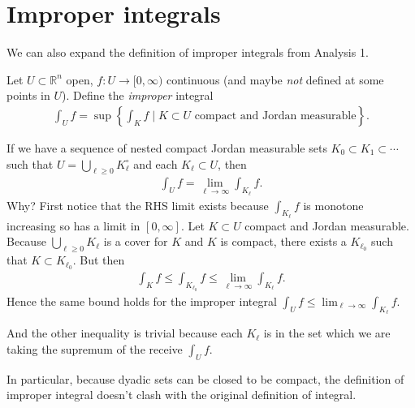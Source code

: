 \section{Improper integrals}

We can also expand the definition of improper integrals from Analysis 1.

\begin{definition}\label{def:improp-int}
	Let $U \subset \mathbb{R}^{n}$ open, $f: U \to [0,\infty)$ continuous (and maybe \textit{not} defined at some points in $U$). Define the \textit{improper} integral
	\begin{align*}
		\int_{U} f = \sup \left\{ \int_{K} f \mid K \subset U \text{ compact and Jordan measurable} \right\}.
	\end{align*}
\end{definition}

\begin{remark}
	If we have a sequence of nested compact Jordan measurable sets $K_{0} \subset K_{1} \subset \cdots$ such that $U = \bigcup_{\ell \geq 0} K_{\ell}^{\circ }$ and each $K_{\ell} \subset U$, then
	\begin{align*}
		\int_{U} f = \lim_{\ell \to \infty} \int_{K_{\ell}} f.
	\end{align*}
	Why? First notice that the RHS limit exists because $ \int_{K_{\ell}} f$ is monotone increasing so has a limit in $[0,\infty]$. Let $K \subset U$ compact and Jordan measurable. Because $\bigcup_{\ell \geq 0} K_{\ell}$ is a cover for $K$ and $K$ is compact, there exists a $K_{\ell_{0}}$ such that $K \subset K_{\ell_{0}}$. But then
	\begin{align*}
		\int_{K} f \leq \int_{K_{\ell_{0}}} f \leq \lim_{\ell \to \infty} \int_{K_{\ell}} f.
	\end{align*}
	Hence the same bound holds for the improper integral $\int_{U} f \leq \lim_{\ell \to \infty} \int_{K_{\ell}} f$.

	And the other inequality is trivial because each $K_{\ell}$ is in the set which we are taking the supremum of the receive $ \int_{U} f$.

	In particular, because dyadic sets can be closed to be compact, the definition of improper integral doesn't clash with the original definition of integral.
\end{remark}
